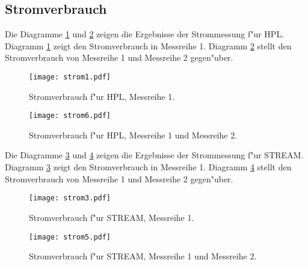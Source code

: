 \subsection{Stromverbrauch}\label{Ergebnisse-Energenie}

Die Diagramme \ref{fig:strom1} und \ref{fig:strom6} zeigen die Ergebnisse der Strommessung f"ur HPL. Diagramm \ref{fig:strom1} zeigt den Stromverbrauch in Messreihe 1. Diagramm \ref{fig:strom6} stellt den Stromverbrauch von Messreihe 1 und Messreihe 2 gegen"uber. 
\begin{figure}[htb]
  \centering
  \texttt{[image: strom1.pdf]}\\ 
  \caption{Stromverbrauch f"ur HPL, Messreihe 1.}\label{fig:strom1}
\end{figure}
\begin{figure}[htb]
  \centering
  \texttt{[image: strom6.pdf]}\\ 
  \caption{Stromverbrauch f"ur HPL, Messreihe 1 und Messreihe 2.}\label{fig:strom6}
\end{figure}

\noindent
Die Diagramme \ref{fig:strom3} und \ref{fig:strom5} zeigen die Ergebnisse der Strommessung f"ur STREAM. Diagramm \ref{fig:strom3} zeigt den Stromverbrauch in Messreihe 1. Diagramm \ref{fig:strom5} stellt den Stromverbrauch von Messreihe 1 und Messreihe 2 gegen"uber.
\begin{figure}[htb]
  \centering
  \texttt{[image: strom3.pdf]}\\ 
  \caption{Stromverbrauch f"ur STREAM, Messreihe 1.}\label{fig:strom3}
\end{figure}
\begin{figure}[htb]
  \centering
  \texttt{[image: strom5.pdf]}\\ 
  \caption{Stromverbrauch f"ur STREAM, Messreihe 1 und Messreihe 2.}\label{fig:strom5}
\end{figure}
\endinput 


